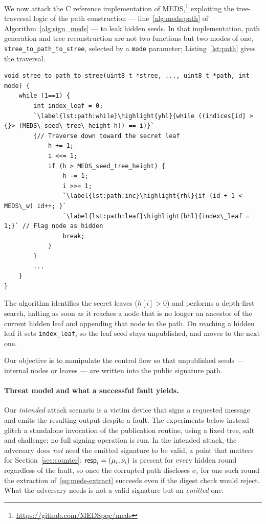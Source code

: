 We now attack the C reference implementation of MEDS,\footnote{\url{https://github.com/MEDSpqc/meds}}
exploiting the tree-traversal logic of the path construction --- line~\ref{alg:meds:path} of
Algorithm~\ref{alg:sign_meds} --- to leak hidden seeds. In that
implementation, path generation and tree reconstruction are not two functions
but two modes of one, \texttt{stree\_to\_path\_to\_stree}, selected by a
\texttt{mode} parameter; Listing~\ref{lst:path} gives the traversal.

\begin{lstlisting}[style=cstyle,caption={Traversal loop of \texttt{stree\_to\_path\_to\_stree}; highlights mark the three fault targets.},label=lst:path]
void stree_to_path_to_stree(uint8_t *stree, ..., uint8_t *path, int mode) {
    while (1==1) {
        int index_leaf = 0;
        `\label{lst:path:while}\highlight{yhl}{while ((indices[id] >{}> (MEDS\_seed\_tree\_height-h)) == i)}`
        {// Traverse down toward the secret leaf
            h += 1;
            i <<= 1;
            if (h > MEDS_seed_tree_height) {
                h -= 1;
                i >>= 1;
                `\label{lst:path:inc}\highlight{rhl}{if (id + 1 < MEDS\_w) id++; }`
                `\label{lst:path:leaf}\highlight{bhl}{index\_leaf = 1;}` // Flag node as hidden
                break;
            }
        }
        ...
    }
}
\end{lstlisting}

The algorithm identifies the secret leaves ($h[i] > 0$) and performs a
depth-first search, halting as soon as it reaches a node that is no longer an
ancestor of the current hidden leaf and appending that node to the path. On
reaching a hidden leaf it sets \texttt{index\_leaf}, so the leaf seed stays
unpublished, and moves to the next one.

Our objective is to manipulate the control flow so that unpublished seeds ---
internal nodes or leaves --- are written into the public signature path.

\paragraph{Threat model and what a successful fault yields.}
Our \emph{intended} attack scenario is a victim device that signs a requested
message and emits the resulting output despite a fault. The experiments
below instead glitch a standalone invocation of the publication routine,
using a fixed tree, salt and challenge; no full signing operation is run.
In the intended attack, the adversary does \emph{not} need the
emitted signature to be valid, a point that matters for
Section~\ref{sec:counter}: $\mathsf{resp}_i = (\mu_i,\nu_i)$ is present for every
hidden round regardless of the fault, so once the corrupted path discloses
$\sigma_i$ for one such round the extraction of~\eqref{eq:meds-extract}
succeeds even if the digest check would reject. What the adversary needs is
not a valid signature but an \emph{emitted} one.

